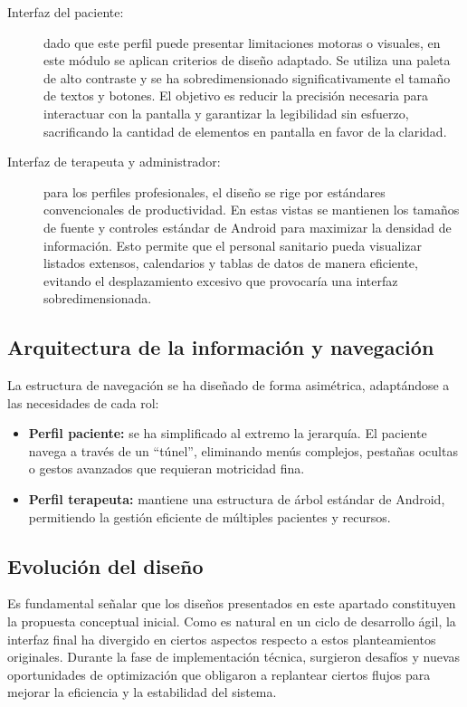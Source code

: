 \begin{description}
    \item[Interfaz del paciente:] dado que este perfil puede presentar limitaciones motoras o visuales, en este módulo se aplican criterios de diseño adaptado. Se utiliza una paleta de alto contraste y se ha sobredimensionado significativamente el tamaño de textos y botones. El objetivo es reducir la precisión necesaria para interactuar con la pantalla y garantizar la legibilidad sin esfuerzo, sacrificando la cantidad de elementos en pantalla en favor de la claridad.
    
    \item[Interfaz de terapeuta y administrador:] para los perfiles profesionales, el diseño se rige por estándares convencionales de productividad. En estas vistas se mantienen los tamaños de fuente y controles estándar de Android para maximizar la densidad de información. Esto permite que el personal sanitario pueda visualizar listados extensos, calendarios y tablas de datos de manera eficiente, evitando el desplazamiento excesivo que provocaría una interfaz sobredimensionada.
\end{description}

\subsection{Arquitectura de la información y navegación}
La estructura de navegación se ha diseñado de forma asimétrica, adaptándose a las necesidades de cada rol:
\begin{itemize}
    \item \textbf{Perfil paciente:} se ha simplificado al extremo la jerarquía. El paciente navega a través de un ``túnel'', eliminando menús complejos, pestañas ocultas o gestos avanzados que requieran motricidad fina.
    \item \textbf{Perfil terapeuta:} mantiene una estructura de árbol estándar de Android, permitiendo la gestión eficiente de múltiples pacientes y recursos.
\end{itemize}

\subsection{Evolución del diseño}
Es fundamental señalar que los diseños presentados en este apartado constituyen la propuesta conceptual inicial. Como es natural en un ciclo de desarrollo ágil, la interfaz final ha divergido en ciertos aspectos respecto a estos planteamientos originales. Durante la fase de implementación técnica, surgieron desafíos y nuevas oportunidades de optimización que obligaron a replantear ciertos flujos para mejorar la eficiencia y la estabilidad del sistema.

